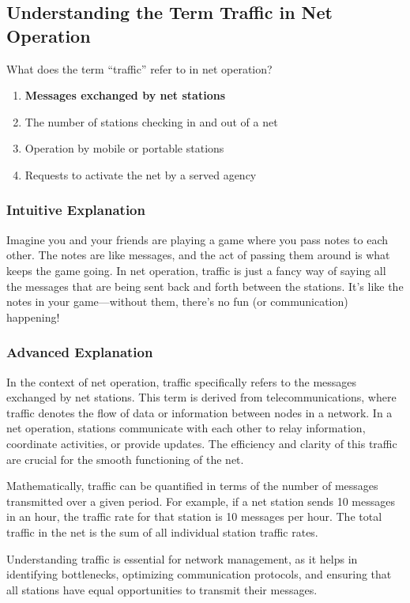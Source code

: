 \subsection{Understanding the Term Traffic in Net Operation}
\label{T2C05}

\begin{tcolorbox}[colback=gray!10!white,colframe=black!75!black,title=T2C05]
What does the term “traffic” refer to in net operation?
\begin{enumerate}[label=\Alph*)]
    \item \textbf{Messages exchanged by net stations}
    \item The number of stations checking in and out of a net
    \item Operation by mobile or portable stations
    \item Requests to activate the net by a served agency
\end{enumerate}
\end{tcolorbox}

\subsubsection{Intuitive Explanation}
Imagine you and your friends are playing a game where you pass notes to each other. The notes are like messages, and the act of passing them around is what keeps the game going. In net operation, traffic is just a fancy way of saying all the messages that are being sent back and forth between the stations. It's like the notes in your game—without them, there's no fun (or communication) happening!

\subsubsection{Advanced Explanation}
In the context of net operation, traffic specifically refers to the messages exchanged by net stations. This term is derived from telecommunications, where traffic denotes the flow of data or information between nodes in a network. In a net operation, stations communicate with each other to relay information, coordinate activities, or provide updates. The efficiency and clarity of this traffic are crucial for the smooth functioning of the net.

Mathematically, traffic can be quantified in terms of the number of messages transmitted over a given period. For example, if a net station sends 10 messages in an hour, the traffic rate for that station is 10 messages per hour. The total traffic in the net is the sum of all individual station traffic rates.

Understanding traffic is essential for network management, as it helps in identifying bottlenecks, optimizing communication protocols, and ensuring that all stations have equal opportunities to transmit their messages.

